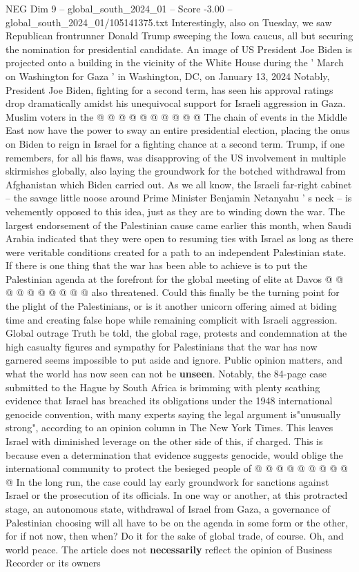 \begin{textsample}{NEG Dim 9 – global\_south\_2024\_01 – Score -3.00 – global\_south\_2024\_01/105141375.txt}
Interestingly, also on Tuesday, we saw Republican frontrunner Donald Trump sweeping the Iowa caucus, all but securing the nomination for presidential candidate.
An image of US President Joe Biden is projected onto a building in the vicinity of the White House during the ' March on Washington for Gaza ' in Washington, DC, on January 13, 2024 Notably, President Joe Biden, fighting for a second term, has seen his approval ratings drop dramatically amidst his unequivocal support for Israeli aggression in Gaza.
Muslim voters in the @ @ @ @ @ @ @ @ @ @ The chain of events in the Middle East now have the power to sway an entire presidential election, placing the onus on Biden to reign in Israel for a fighting chance at a second term.
Trump, if one remembers, for all his flaws, was disapproving of the US involvement in multiple skirmishes globally, also laying the groundwork for the botched withdrawal from Afghanistan which Biden carried out.
As we all know, the Israeli far-right cabinet -- the savage little noose around Prime Minister Benjamin Netanyahu ' s neck -- is vehemently opposed to this idea, just as they are to winding down the war.
The largest endorsement of the Palestinian cause came earlier this month, when Saudi Arabia indicated that they were open to resuming ties with Israel as long as there were veritable conditions created for a path to an independent Palestinian state.
If there is one thing that the war has been able to achieve is to put the Palestinian agenda at the forefront for the global meeting of elite at Davos @ @ @ @ @ @ @ @ @ @ also threatened.
Could this finally be the turning point for the plight of the Palestinians, or is it another unicorn offering aimed at biding time and creating false hope while remaining complicit with Israeli aggression.
Global outrage Truth be told, the global rage, protests and condemnation at the high casualty figures and sympathy for Palestinians that the war has now garnered seems impossible to put aside and ignore.
Public opinion matters, and what the world has now seen can not be \textbf{unseen}.
Notably, the 84-page case submitted to the Hague by South Africa is brimming with plenty scathing evidence that Israel has breached its obligations under the 1948 international genocide convention, with many experts saying the legal argument is"unusually strong", according to an opinion column in The New York Times.
This leaves Israel with diminished leverage on the other side of this, if charged.
This is because even a determination that evidence suggests genocide, would oblige the international community to protect the besieged people of @ @ @ @ @ @ @ @ @ @ In the long run, the case could lay early groundwork for sanctions against Israel or the prosecution of its officials.
In one way or another, at this protracted stage, an autonomous state, withdrawal of Israel from Gaza, a governance of Palestinian choosing will all have to be on the agenda in some form or the other, for if not now, then when?
Do it for the sake of global trade, of course.
Oh, and world peace.
The article does not \textbf{necessarily} reflect the opinion of Business Recorder or its owners

\end{textsample}
